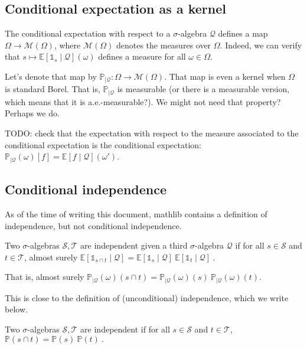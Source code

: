 
\subsection{Conditional expectation as a kernel}
\label{sub:conditional_expectation_as_a_kernel}


The conditional expectation with respect to a $\sigma$-algebra $\mathcal Q$ defines a map $\Omega \to \mathcal M(\Omega)$, where $\mathcal M(\Omega)$ denotes the measures over $\Omega$.
Indeed, we can verify that $s \mapsto \mathbb{E}[\mathbb{1}_{s} \mid \mathcal Q](\omega)$ defines a measure for all $\omega \in \Omega$.

Let's denote that map by $\mathbb{P}_{| \mathcal Q}: \Omega \to \mathcal M(\Omega)$.
That map is even a kernel when $\Omega$ is standard Borel. That is, $\mathbb{P}_{| \mathcal Q}$ is measurable (or there is a measurable version, which means that it is a.e.-measurable?). We might not need that property? Perhaps we do.

TODO: check that the expectation with respect to the measure associated to the conditional expectation is the conditional expectation: $\mathbb{P}_{| \mathcal Q}(\omega)[f] = \mathbb{E}[f \mid \mathcal Q](\omega')$.

\subsection{Conditional independence}
\label{sub:conditional_independence}


As of the time of writing this document, mathlib contains a definition of independence, but not conditional independence.

\begin{definition}
Two $\sigma$-algebras $\mathcal S, \mathcal T$ are independent given a third $\sigma$-algebra $\mathcal Q$ if for all $s \in \mathcal S$ and $t \in \mathcal T$, almost surely
$
\mathbb{E}[\mathbb{1}_{s \cap t} \mid \mathcal Q] = \mathbb{E}[\mathbb{1}_{s} \mid \mathcal Q] \: \mathbb{E}[\mathbb{1}_{t} \mid \mathcal Q]
\: .
$

That is, almost surely $\mathbb{P}_{| \mathcal Q}(\omega)(s \cap t) = \mathbb{P}_{| \mathcal Q}(\omega)(s) \: \mathbb{P}_{| \mathcal Q}(\omega)(t)$.
\end{definition}

This is close to the definition of (unconditional) independence, which we write below.
\begin{definition}
Two $\sigma$-algebras $\mathcal S, \mathcal T$ are independent if for all $s \in \mathcal S$ and $t \in \mathcal T$,
$
\mathbb{P}(s \cap t) = \mathbb{P}(s) \: \mathbb{P}(t)
\: .
$
\end{definition}

